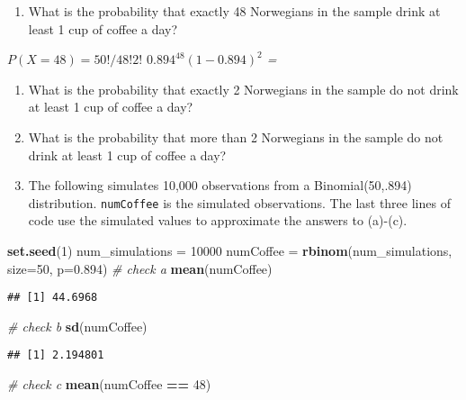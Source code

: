 \documentclass[]{article}
\newenvironment{Shaded}{\begin{snugshade}}{\end{snugshade}}
\newcommand{\CommentTok}[1]{\textcolor[rgb]{0.56,0.35,0.01}{\textit{#1}}}
\newcommand{\DataTypeTok}[1]{\textcolor[rgb]{0.13,0.29,0.53}{#1}}
\newcommand{\DecValTok}[1]{\textcolor[rgb]{0.00,0.00,0.81}{#1}}
\newcommand{\FloatTok}[1]{\textcolor[rgb]{0.00,0.00,0.81}{#1}}
\newcommand{\KeywordTok}[1]{\textcolor[rgb]{0.13,0.29,0.53}{\textbf{#1}}}
\newcommand{\NormalTok}[1]{#1}
\newcommand{\OperatorTok}[1]{\textcolor[rgb]{0.81,0.36,0.00}{\textbf{#1}}}
\newcommand{\StringTok}[1]{\textcolor[rgb]{0.31,0.60,0.02}{#1}}
\providecommand{\tightlist}{%
  \setlength{\itemsep}{0pt}\setlength{\parskip}{0pt}}
\begin{document}
\begin{enumerate}
\def\labelenumi{\alph{enumi})}
\setcounter{enumi}{2}
\tightlist
\item
  What is the probability that exactly 48 Norwegians in the sample drink
  at least 1 cup of coffee a day?
\end{enumerate}

\emph{\(P(X=48) = 50!/48!2!\) \(0.894^{48}(1-0.894)^{2}\) =}

\begin{enumerate}
\def\labelenumi{\alph{enumi})}
\setcounter{enumi}{3}
\item
  What is the probability that exactly 2 Norwegians in the sample do not
  drink at least 1 cup of coffee a day?
\item
  What is the probability that more than 2 Norwegians in the sample do
  not drink at least 1 cup of coffee a day?
\item
  The following simulates 10,000 observations from a Binomial(50,.894)
  distribution. \texttt{numCoffee} is the simulated observations. The
  last three lines of code use the simulated values to approximate the
  answers to (a)-(c).
\end{enumerate}

\begin{Shaded}
\begin{Highlighting}[]
\KeywordTok{set.seed}\NormalTok{(}\DecValTok{1}\NormalTok{)}
\NormalTok{num_simulations =}\StringTok{ }\DecValTok{10000}
\NormalTok{numCoffee =}\StringTok{ }\KeywordTok{rbinom}\NormalTok{(num_simulations, }\DataTypeTok{size=}\DecValTok{50}\NormalTok{, }\DataTypeTok{p=}\FloatTok{0.894}\NormalTok{)}
\CommentTok{# check a}
\KeywordTok{mean}\NormalTok{(numCoffee)}
\end{Highlighting}
\end{Shaded}

\begin{verbatim}
## [1] 44.6968
\end{verbatim}

\begin{Shaded}
\begin{Highlighting}[]
\CommentTok{# check b}
\KeywordTok{sd}\NormalTok{(numCoffee)}
\end{Highlighting}
\end{Shaded}

\begin{verbatim}
## [1] 2.194801
\end{verbatim}

\begin{Shaded}
\begin{Highlighting}[]
\CommentTok{# check c}
\KeywordTok{mean}\NormalTok{(numCoffee }\OperatorTok{==}\StringTok{ }\DecValTok{48}\NormalTok{)}
\end{Highlighting}
\end{Shaded}
\end{document}
